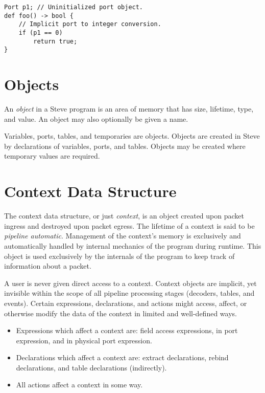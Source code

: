 \noindent\begin{minipage}{\linewidth}
\begin{lstlisting}
Port p1; // Uninitialized port object.
def foo() -> bool {
	// Implicit port to integer conversion.
	if (p1 == 0)
		return true;
}
\end{lstlisting}
\end{minipage}

\section{Objects} \label{object_guide}

An \textit{object} in a Steve program is an area of memory that has size, lifetime, type, and value. An object may also optionally be given a name.

Variables, ports, tables, and temporaries are objects. Objects are created in Steve by declarations of variables, ports, and tables. Objects may be created where temporary values are required.

\section{Context Data Structure} \label{context_guide}

The context data structure, or just \textit{context}, is an object created upon packet ingress and destroyed upon packet egress. The lifetime of a context is said to be \textit{pipeline automatic}. Management of the context's memory is exclusively and automatically handled by internal mechanics of the program during runtime. This object is used exclusively by the internals of the program to keep track of information about a packet. 

A user is never given direct access to a context. Context objects are implicit, yet invisible within the scope of all pipeline processing stages (decoders, tables, and events). Certain expressions, declarations, and actions might access, affect, or otherwise modify the data of the context in limited and well-defined ways. 
\begin{itemize}
\item Expressions which affect a context are: field access expressions, in port expression, and in physical port expression.

\item Declarations which affect a context are: extract declarations, rebind declarations, and table declarations (indirectly).

\item All actions affect a context in some way.
\end{itemize}

